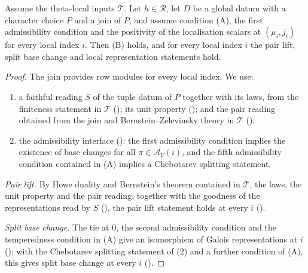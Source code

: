 \begin{proposition}\label{pf:liftinj:bcond}
Assume the theta-local inputs $\mathcal T$. Let $h\in\mathcal R$, let $D$ be a global datum with a character choice $P$ and a join of $P$, and assume
condition (A), the first admissibility condition and the positivity of the localisation scalars at $(\mu_i,j_i)$ for every local index $i$. Then (B)
holds, and for every local index $i$ the pair lift, split base change and local representation statements hold.
\end{proposition}

\begin{proof}
The join provides row modules for every local index. We use:
\begin{enumerate}[label=(\arabic*)]
\item a faithful reading $S$ of the tuple datum of $P$ together with its laws, from the finiteness statement in $\mathcal T$
(); its unit property
(); and the pair reading obtained from the join and Bernstein--Zelevinsky theory in $\mathcal T$
();
\item the admissibility interface (): the first admissibility condition implies the existence of base
changes for all $\pi\in\mathcal A_V(i)$, and the fifth admissibility condition contained in (A) implies a Chebotarev splitting statement.
\end{enumerate}
\emph{Pair lift.} By Howe duality and Bernstein's theorem contained in $\mathcal T$, the laws, the unit property and the pair reading, together with the
goodness of the representations read by $S$ (), the pair lift statement holds at every $i$
().

\emph{Split base change.} The tie at $0$, the second admissibility condition and the temperedness condition in (A) give an isomorphism of Galois
representations at $i$ (); with the Chebotarev splitting statement of (2) and a further condition of
(A), this gives split base change at every $i$ ().


\end{proof}
